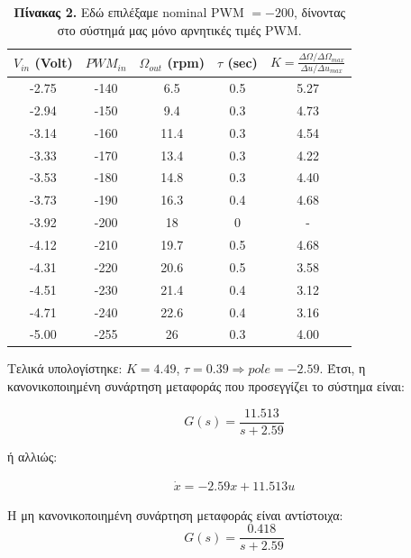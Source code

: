 \documentclass{article}
\begin{document}
    \begin{table}[!h]
        \centering
        \begin{tabular}{|c|c|c|c|c|}
        \hline
            \(V_{in}\) (Volt) & \(PWM_{in}\) & \(\Omega_{out}\) (rpm) & \(\tau\) (sec) & \(Κ = \frac{\Delta\Omega/\Delta\Omega_{max}}{\Delta u/{\Delta u}_{max}}\)\\ \hline
            -2.75 & -140 &  6.5 & 0.5 & 5.27\\ \hline
            -2.94 & -150 &  9.4 & 0.3 & 4.73\\ \hline
            -3.14 & -160 & 11.4 & 0.3 & 4.54\\ \hline
            -3.33 & -170 & 13.4 & 0.3 & 4.22\\ \hline
            -3.53 & -180 & 14.8 & 0.3 & 4.40\\ \hline
            -3.73 & -190 & 16.3 & 0.4 & 4.68\\ \hline
            -3.92 & -200 &   18 &   0 & -   \\ \hline
            -4.12 & -210 & 19.7 & 0.5 & 4.68\\ \hline
            -4.31 & -220 & 20.6 & 0.5 & 3.58\\ \hline
            -4.51 & -230 & 21.4 & 0.4 & 3.12\\ \hline
            -4.71 & -240 & 22.6 & 0.4 & 3.16\\ \hline
            -5.00 & -255 &   26 & 0.3 & 4.00
        \end{tabular}
        \caption{\textbf{Πίνακας 2.} Εδώ επιλέξαμε nominal PWM \(= -200\), δίνοντας στο σύστημά μας μόνο αρνητικές τιμές PWM.}
    \end{table}

    \hfill\break
    Τελικά υπολογίστηκε: \(K = 4.49\), \(\tau = 0.39 \Rightarrow pole = -2.59\). Έτσι, η κανονικοποιημένη συνάρτηση μεταφοράς που προσεγγίζει το σύστημα είναι:
    
    \begin{equation*}
        \boxed{G(s) = \frac{11.513}{s + 2.59}}
    \end{equation*}
    
    \noindent
    ή αλλιώς:
    
    \begin{align*}
        \dot{x} = -2.59x + 11.513u
    \end{align*}
    
    \noindent
    Η μη κανονικοποιημένη συνάρτηση μεταφοράς είναι αντίστοιχα:
    \begin{equation*}
        \boxed{G(s) = \frac{0.418}{s + 2.59}}
    \end{equation*}
\end{document}
